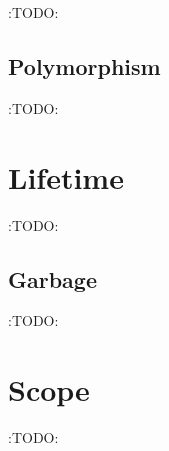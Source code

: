 \documentclass[11pt]{article}
\theoremstyle{definition}
\begin{document}
:TODO:

\subsection{Polymorphism}
\label{sec:orgaa94cce}

:TODO:

\section{Lifetime}
\label{sec:org1afc1d4}

:TODO:

\subsection{Garbage}
\label{sec:org8d62365}

:TODO:

\section{Scope}
\label{sec:org9e892f0}

:TODO:
\end{document}
